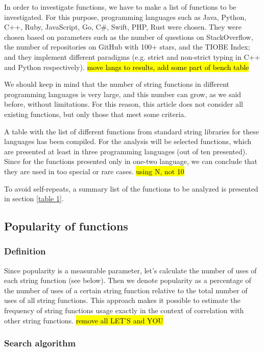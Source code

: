 \documentclass[anonymous,sigplan,review,11pt,nonacm,natbib=false]{acmart}
\begin{document}
    In order to investigate functions, we have to make a list of functions to be investigated. For this purpose, programming languages such as Java, Python, C++, Ruby, JavaScript, Go, C\#, Swift, PHP, Rust were chosen. They were chosen based on parameters such as the number of questions on StackOverflow, the number of repositories on GitHub with 100+ stars, and the TIOBE Index; and they implement different paradigms (e.g. strict and non-strict typing in C++ and Python respectively). \hl{move langs to results, add some part of bench table}

    We should keep in mind that the number of string functions in different programming languages is very large, and this number can grow, as we said before, without limitations. For this reason, this article does not consider all existing functions, but only those that meet some criteria.

    A table with the list of different functions from standard string libraries for these languages has been compiled. For the analysis will be selected functions, which are presented at least in three programming languages (out of ten presented). Since for the functions presented only in one-two language, we can conclude that they are used in too special or rare cases. \hl{using N, not 10}

    To avoid self-repeats, a summary list of the functions to be analyzed is presented in section \ref{table 1}.

    \subsection{Popularity of functions}

    \subsubsection{Definition}

    Since popularity is a measurable parameter, let's calculate the number of uses of each string function (see below). Then we denote popularity as a percentage of the number of uses of a certain string function relative to the total number of uses of all string functions. This approach makes it possible to estimate the frequency of string functions usage exactly in the context of correlation with other string functions. \hl{remove all LET'S and YOU}

    \subsubsection{Search algorithm}
\end{document}
